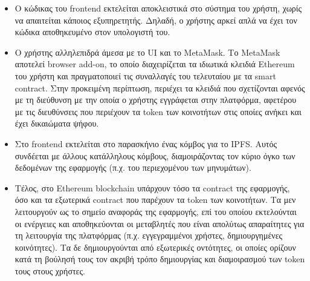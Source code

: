 \begin{itemize}
    \item Ο κώδικας του frontend εκτελείται αποκλειστικά στο σύστημα του χρήστη, χωρίς να απαιτείται κάποιος εξυπηρετητής. Δηλαδή, ο χρήστης αρκεί απλά να έχει τον κώδικα αποθηκευμένο στον υπολογιστή του.
    \item Ο χρήστης αλληλεπιδρά άμεσα με το UI και το MetaMask. Το MetaMask αποτελεί browser add-on, το οποίο διαχειρίζεται τα ιδιωτικά κλειδιά Ethereum του χρήστη και πραγματοποιεί τις συναλλαγές του τελευταίου με τα smart contract. Στην προκειμένη περίπτωση, περιέχει τα κλειδιά που σχετίζονται αφενός με τη διεύθυνση με την οποία ο χρήστης εγγράφεται στην πλατφόρμα, αφετέρου με τις διευθύνσεις που περιέχουν τα token των κοινοτήτων στις οποίες ανήκει και έχει δικαιώματα ψήφου.
    \item Στο frontend εκτελείται στο παρασκήνιο ένας κόμβος για το IPFS. Αυτός συνδέεται με άλλους κατάλληλους κόμβους, διαμοιράζοντας τον κύριο όγκο των δεδομένων της εφαρμογής (π.χ. του περιεχομένου των μηνυμάτων).
    \item Τέλος, στο Ethereum blockchain υπάρχουν τόσο τα contract της εφαρμογής, όσο και τα εξωτερικά contract που παρέχουν τα token των κοινοτήτων. Τα μεν λειτουργούν ως το σημείο αναφοράς της εφαρμογής, επί του οποίου εκτελούνται οι ενέργειες και αποθηκεύονται οι μεταβλητές που είναι απολύτως απαραίτητες για τη λειτουργία της πλατφόρμας (π.χ. εγγεγραμμένοι χρήστες, δημιουργημένες κοινότητες). Τα δε δημιουργούνται από εξωτερικές οντότητες, οι οποίες ορίζουν κατά τη βούλησή τους τον ακριβή τρόπο δημιουργίας και διαμοιρασμού των token τους στους χρήστες.
\end{itemize}